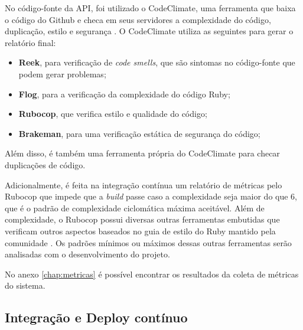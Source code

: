 No código-fonte da API, foi utilizado o CodeClimate, uma ferramenta que baixa o código do Github e checa em seus servidores a complexidade do código, duplicação, estilo e segurança \cite{codeclimate}. O CodeClimate utiliza as seguintes para gerar o relatório final:
\begin{itemize}
    \item \textbf{Reek}, para verificação de \textit{code smells}, que são sintomas no código-fonte que podem gerar problemas;
    \item \textbf{Flog}, para a verificação da complexidade do código Ruby;
    \item \textbf{Rubocop}, que verifica estilo e qualidade do código;
    \item \textbf{Brakeman}, para uma verificação estática de segurança do código;
\end{itemize}

Além disso, é também uma ferramenta própria do CodeClimate para checar duplicações de código.

Adicionalmente, é feita na integração contínua um relatório de métricas pelo Rubocop que impede que a \textit{build} passe caso a complexidade seja maior do que 6, que é o padrão de complexidade ciclomática máxima aceitável. Além de complexidade, o Rubocop possui diversas outras ferramentas embutidas que verificam outros aspectos baseados no guia de estilo do Ruby mantido pela comunidade \cite{rubocop}. Os padrões mínimos ou máximos dessas outras ferramentas serão analisadas com o desenvolvimento do projeto.

No anexo \ref{chap:metricas} é possível encontrar os resultados da coleta de métricas do sistema.

\subsection{Integração e Deploy contínuo}

